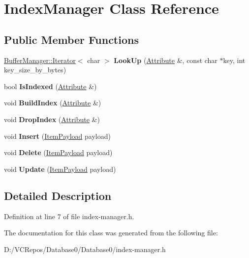 \hypertarget{class_index_manager}{}\section{Index\+Manager Class Reference}
\label{class_index_manager}
\subsection*{Public Member Functions}
\begin{DoxyCompactItemize}
\item 
\mbox{\label{class_index_manager_a325bab97826bc5be2d287448308a1e99}} 
\mbox{\hyperlink{class_buffer_manager_1_1_iterator}{Buffer\+Manager\+::\+Iterator}}$<$ char $>$ {\bfseries Look\+Up} (\mbox{\hyperlink{struct_attribute}{Attribute}} \&, const char $\ast$key, int key\+\_\+size\+\_\+by\+\_\+bytes)
\item 
\mbox{\label{class_index_manager_af9b21c0c205a4d180526d52b55d91e6e}} 
bool {\bfseries Is\+Indexed} (\mbox{\hyperlink{struct_attribute}{Attribute}} \&)
\item 
\mbox{\label{class_index_manager_a269e946718a9b6a81805012f90c7c01f}} 
void {\bfseries Build\+Index} (\mbox{\hyperlink{struct_attribute}{Attribute}} \&)
\item 
\mbox{\label{class_index_manager_a97cd23f21d999d84ce00867c5d26ccb4}} 
void {\bfseries Drop\+Index} (\mbox{\hyperlink{struct_attribute}{Attribute}} \&)
\item 
\mbox{\label{class_index_manager_ad53f0943b48fb6d776fe152caa02a45f}} 
void {\bfseries Insert} (\mbox{\hyperlink{struct_item_payload}{Item\+Payload}} payload)
\item 
\mbox{\label{class_index_manager_aa62c42b538b88b628662a50467fe2f22}} 
void {\bfseries Delete} (\mbox{\hyperlink{struct_item_payload}{Item\+Payload}} payload)
\item 
\mbox{\label{class_index_manager_aef150687cc1afc5d9eea278b981584ba}} 
void {\bfseries Update} (\mbox{\hyperlink{struct_item_payload}{Item\+Payload}} payload)
\end{DoxyCompactItemize}


\subsection{Detailed Description}


Definition at line 7 of file index-\/manager.\+h.



The documentation for this class was generated from the following file\+:\begin{DoxyCompactItemize}
\item 
D\+:/\+V\+C\+Repos/\+Database0/\+Database0/index-\/manager.\+h\end{DoxyCompactItemize}
